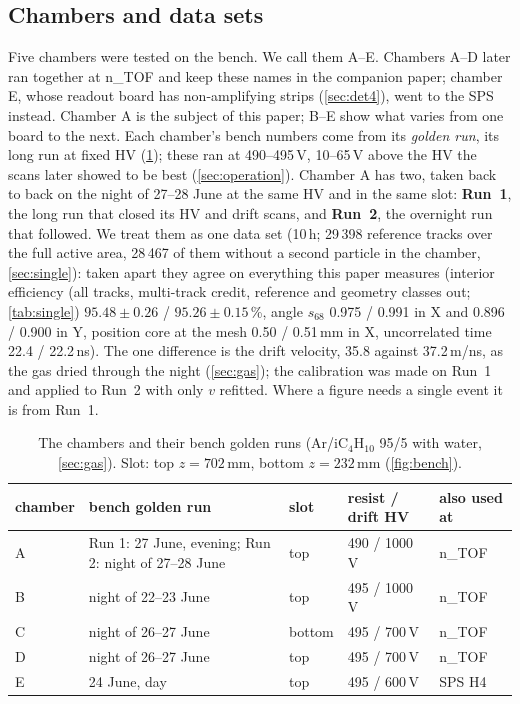 \subsection{Chambers and data sets}\label{sec:datasets}
Five chambers were tested on the bench. We call them A--E. Chambers A--D later ran together at n\_TOF and keep
these names in the companion paper; chamber E, whose readout board has non-amplifying strips (\cref{sec:det4}), went
to the SPS instead. Chamber A is the subject of this paper; B--E show what varies from one board to the next.
Each chamber's bench numbers come from its \emph{golden run}, its long run at fixed HV (\cref{tab:datasets}); these
ran at 490--495\,V, 10--65\,V above the HV the scans later showed to be best (\cref{sec:operation}). Chamber A has two, taken back to back on the night of 27--28 June at the same HV and in the
same slot: \textbf{Run~1}, the long run that closed its HV and drift scans, and \textbf{Run~2}, the overnight run
that followed. We treat them as one data set (10\,h; 29\,398 reference tracks over the full active area, 28\,467 of them without a second particle in the chamber, \cref{sec:single}): taken apart they
agree on everything this paper measures (interior efficiency (all tracks, multi-track credit, reference and geometry classes out; \cref{tab:single}) $95.48\pm0.26$ / $95.26\pm0.15$\,\%, angle $s_{68}$
0.975 / 0.991\textdegree{} in X and 0.896 / 0.900\textdegree{} in Y, position core at the mesh 0.50 / 0.51\,mm in X,
uncorrelated time 22.4 / 22.2\,ns). The one difference is the drift velocity, 35.8 against 37.2\,\textmu m/ns, as
the gas dried through the night (\cref{sec:gas}); the calibration was made on Run~1 and applied to Run~2 with only
$v$ refitted. Where a figure needs a single event it is from Run~1.
\begin{table}[tbp]
  \centering
  \caption{The chambers and their bench golden runs (Ar/iC$_4$H$_{10}$ 95/5 with water, \cref{sec:gas}).
  Slot: top $z=702$\,mm, bottom $z=232$\,mm (\cref{fig:bench}).}
  \label{tab:datasets}
  \begin{tabular}{lllll}
    \hline
    chamber & bench golden run & slot & resist / drift HV & also used at \\
    \hline
    A & Run 1: 27 June, evening; Run 2: night of 27--28 June & top & 490 / 1000\,V & n\_TOF \\
    B & night of 22--23 June & top & 495 / 1000\,V & n\_TOF \\
    C & night of 26--27 June & bottom & 495 / 700\,V & n\_TOF \\
    D & night of 26--27 June & top & 495 / 700\,V & n\_TOF \\
    E & 24 June, day & top & 495 / 600\,V & SPS H4 \\
    \hline
  \end{tabular}
\end{table}

